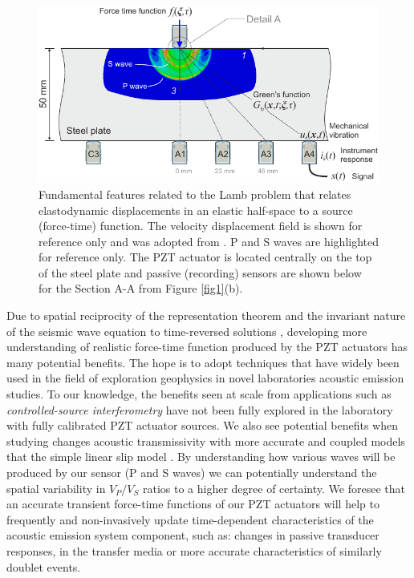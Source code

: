 \documentclass[preprint,3p, 11pt,authoryear]{elsarticle}
\begin{document}
\begin{figure}[h]
     	\centering
\includegraphics[scale= 1.0]{FIG2.pdf} 
\caption{Fundamental features related to the Lamb problem that relates elastodynamic displacements in an elastic half-space to a source (force-time) function. The velocity displacement field is shown for reference only and was adopted from \citet{Selvadurai2019}. P and S waves are highlighted for reference only. The PZT actuator is located centrally on the top of the steel plate and passive (recording) sensors are shown below for the Section A-A from Figure \ref{fig1}(b).}
	\label{fig2} 
\end{figure}

Due to spatial reciprocity of the representation theorem \citep{Aki2002} and the invariant nature of the seismic wave equation to time-reversed solutions \citep{Fink1992}, developing more understanding of realistic force-time function produced by the PZT actuators has many potential benefits. The hope is to adopt techniques that have widely been used in the field of exploration geophysics in novel laboratories acoustic emission studies. To our knowledge, the benefits seen at scale from applications such as \textit{controlled-source interferometry} have not been fully explored in the laboratory with fully calibrated PZT actuator sources. We also see potential benefits when studying changes acoustic transmissivity \citep{PyrakNolte1980} with more accurate and coupled models that the simple linear slip model \citep[LSM,][]{Kendall1957}.  By understanding how various waves will be produced by our sensor (P and S waves) we can potentially understand the spatial variability in $V_{P}/V_{S}$ ratios to a higher degree of certainty. We foresee that an accurate transient force-time functions of our PZT actuators will help to frequently and non-invasively update time-dependent characteristics of the acoustic emission system component, such as: changes in passive transducer responses, in the transfer media or more accurate characteristics of similarly doublet events.  
\end{document}
